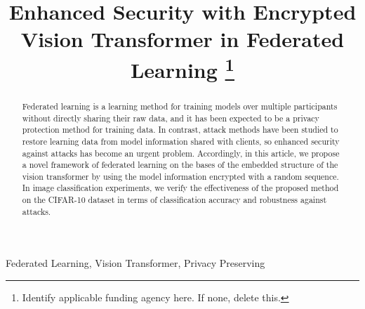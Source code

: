 \documentclass[conference, a4paper]{IEEEtran}
\begin{document}
\title{Enhanced Security with Encrypted Vision Transformer in Federated Learning
\thanks{Identify applicable funding agency here. If none, delete this.}
}

\author{
\and
{}
\and
{}

}

\maketitle

\begin{abstract}
Federated learning is a learning method for training models over multiple participants without directly sharing their raw data, and it has been expected to be a privacy protection method for training data. In contrast, attack methods have been studied to restore learning data from model information shared with clients, so enhanced security against attacks has become an urgent problem. Accordingly, in this article, we propose a novel framework of federated learning on the bases of the embedded structure of the vision transformer by using the model information encrypted with a random sequence. In image classification experiments, we verify the effectiveness of the proposed method on the CIFAR-10 dataset in terms of classification accuracy and robustness against attacks.
\end{abstract}

\begin{IEEEkeywords}
Federated Learning, Vision Transformer, Privacy Preserving
\end{IEEEkeywords}
\end{document}
